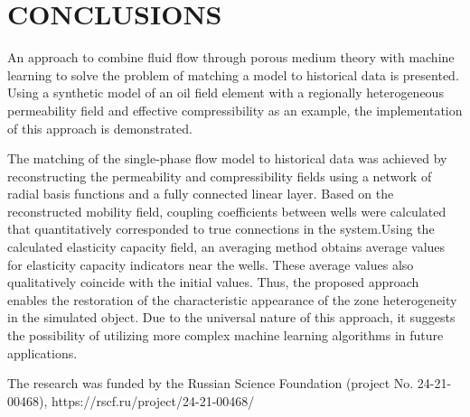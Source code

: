 \documentclass[
11pt,%
tightenlines,%
twoside,%
onecolumn,%
nofloats,%
nobibnotes,%
nofootinbib,%
superscriptaddress,%
noshowpacs,%
centertags]%
{revtex4}
\begin{document}
\section{CONCLUSIONS}

An approach to combine fluid flow through porous medium theory with machine learning to solve the problem of matching a model to historical data is presented. Using a synthetic model of an oil field element with a regionally heterogeneous permeability field and effective compressibility as an example, the implementation of this approach is demonstrated.

The matching of the single-phase flow model to historical data was achieved by reconstructing the permeability and compressibility fields using a network of radial basis functions and a fully connected linear layer. Based on the reconstructed mobility field, coupling coefficients between wells were calculated that quantitatively corresponded to true connections in the system.Using the calculated elasticity capacity field, an averaging method obtains average values for elasticity capacity indicators near the wells. These average values also qualitatively coincide with the initial values. Thus, the proposed approach enables the restoration of the characteristic appearance of the zone heterogeneity in the simulated object. Due to the universal nature of this approach, it suggests the possibility of utilizing more complex machine learning algorithms in future applications.


\begin{acknowledgments}
The research was funded by the Russian Science Foundation (project No. 24-21-00468), https://rscf.ru/project/24-21-00468/
\end{acknowledgments}


%
%
\end{document}
